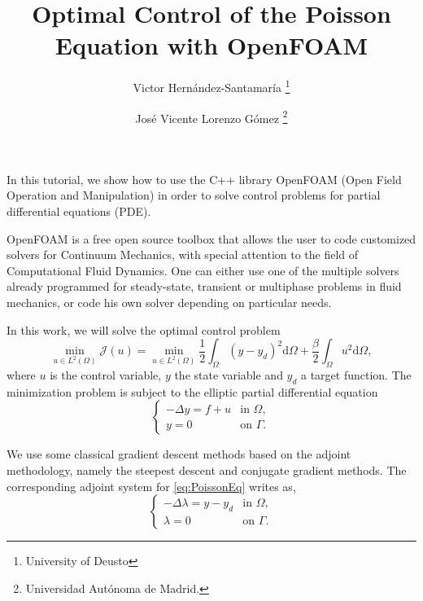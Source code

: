 \documentclass[10pt,a4paper]{article}
\newcommand{\drm}{\mathrm{d}}
\begin{document}
\title{Optimal Control of the Poisson Equation with OpenFOAM}
\author{Victor Hernández-Santamaría \thanks{University of Deusto} \and José Vicente Lorenzo Gómez \thanks{Universidad Autónoma de Madrid.}}

\maketitle

In this tutorial, we show how to use the C++ library OpenFOAM (Open Field Operation and Manipulation) in order to solve control problems for partial differential equations (PDE). 

OpenFOAM is a free open source toolbox that allows the user to code customized solvers for Continuum Mechanics, with special attention to the field of Computational Fluid Dynamics. One can either use one of the multiple solvers already programmed for steady-state, transient or multiphase problems in fluid mechanics, or code his own solver depending on particular needs.

In this work, we will solve the optimal control problem
%
\begin{equation} \label{eq:CostFunctional}
\min _{u \in L^2 \left( \Omega \right)} \mathcal{J}\left( u\right) = \min _{u \in L^2 \left( \Omega \right)} \frac{1}{2} \int_{\Omega} \left( y - y_d \right) ^2 \drm \Omega + \frac{\beta}{2} \int_{\Omega} u ^2 \drm \Omega,
\end{equation}
%
where $u$ is the control variable, $y$ the state variable and $y_d$ a target function. The minimization problem is subject to the elliptic partial differential equation
%
\begin{equation} \label{eq:PoissonEq}
\begin{cases}
-\Delta y  = f + u & \text{in } \Omega, \\
y = 0 & \text{on } \Gamma.
\end{cases}
\end{equation}

We use some classical gradient descent methods based on the adjoint methodology, namely the steepest descent and conjugate gradient methods. The corresponding adjoint system for \eqref{eq:PoissonEq} writes as,
%
\begin{equation} \label{eq:PoissonAdjointEq}
\begin{cases}
- \Delta \lambda = y - y_d & \text{in } \Omega,  \\
\lambda = 0 & \text{on } \Gamma.
\end{cases}
\end{equation}
\end{document}
